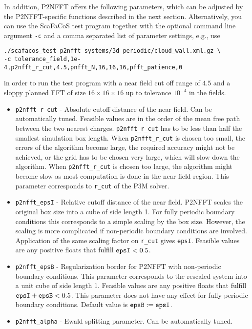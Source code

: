 In addition, P2NFFT offers the following parameters, which can be adjusted by the P2NFFT-specific functions described in the next section.
Alternatively, you can use the ScaFaCoS test program together with the optional command line argument \verb!-c! and a comma separated list
of parameter settings, e.g., use
\begin{verbatim}
./scafacos_test p2nfft systems/3d-periodic/cloud_wall.xml.gz \
-c tolerance_field,1e-4,p2nfft_r_cut,4.5,pnfft_N,16,16,16,pfft_patience,0
\end{verbatim}
in order to run the test program with a near field cut off range of $4.5$ and a sloppy planned FFT of size $16\times 16 \times 16$ up to tolerance $10^{-4}$ in the fields.
\begin{itemize}
  \item \verb!p2nfft_r_cut! -
    Absolute cutoff distance of the near field. Can be
    automatically tuned. Feasible values are in the order of the mean
    free path between the two nearest charges.
    \verb!p2nfft_r_cut! has to be less than half the
    smallest simulation box length.  When \verb!p2nfft_r_cut! is chosen too
    small, the errors of the algorithm become large, the required
    accuracy might not be achieved, or the grid has to be chosen very
    large, which will slow down the algorithm.  When \verb!p2nfft_r_cut! is
    chosen too large, the algorithm might become slow as most
    computation is done in the near field region.
    This parameter corresponds to \verb!r_cut! of the P3M solver.
  \item \verb!p2nfft_epsI! -
    Relative cutoff distance of the near field. P2NFFT scales the original box size into a cube of side length 1.
    For fully periodic boundary conditions this corresponds to a simple scaling by the box size. However, the scaling is more complicated if non-periodic
    boundary conditions are involved. Application of the same scaling factor on \verb!r_cut! gives \verb!epsI!.
    Feasible values are any positive floats that fulfill $\verb!epsI! < 0.5$.
  \item \verb!p2nfft_epsB! -
    Regularization border for P2NFFT with non-periodic boundary conditions. This parameter corresponds to the rescaled system into a unit cube of side length 1.
    Feasible values are any positive floats that fulfill $\verb!epsI! + \verb!epsB! < 0.5$.
    This parameter does not have any effect for fully periodic boundary conditions. Default value is $\verb!epsB! := \verb!epsI!$.
  \item \verb!p2nfft_alpha! -
    Ewald splitting parameter. Can be automatically tuned.

\end{itemize}
